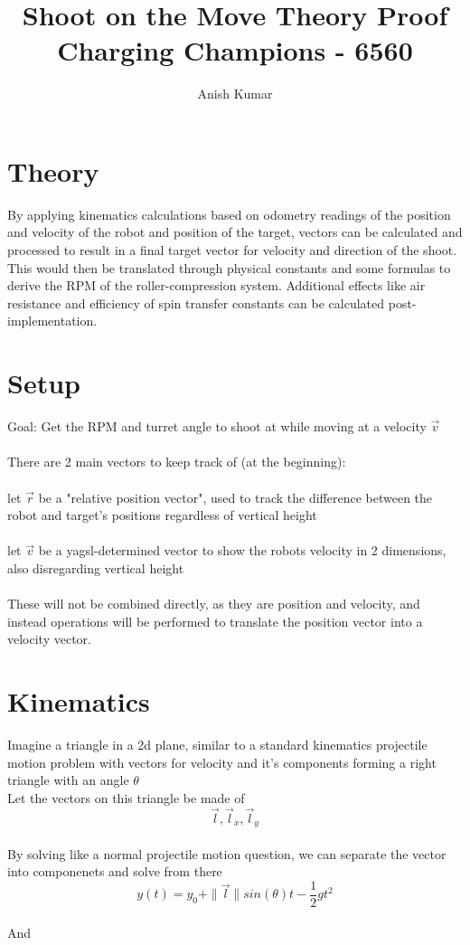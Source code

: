 \documentclass{article}
\title{Shoot on the Move Theory Proof\\
\large Charging Champions - 6560}
\author{Anish Kumar}
\begin{document}
\maketitle

\section{Theory}

By applying kinematics calculations based on odometry readings of the position and velocity of the robot and position of the target, vectors can be calculated and processed to result in a final target vector for velocity and direction of the shoot. This would then be translated through physical constants and some formulas to derive the RPM of the roller-compression system. Additional effects like air resistance and efficiency of spin transfer constants can be calculated post-implementation.

\section{Setup}

Goal: Get the RPM and turret angle to shoot at while moving at a velocity $\vec{v}$
\\
\\
There are 2 main vectors to keep track of (at the beginning):
\\
\\
let $\vec{r}$ be a "relative position vector", used to track the difference between the robot and target's positions regardless of vertical height 
\\
\\
let $\vec{v}$ be a yagsl-determined vector to show the robots velocity in 2 dimensions, also disregarding vertical height
\\
\\
These will not be combined directly, as they are position and velocity, and instead operations will be performed to translate the position vector into a velocity vector.
\\

\section{Kinematics}

Imagine a triangle in a 2d plane, similar to a standard kinematics projectile motion problem with vectors for velocity and it's components forming a right triangle with an angle $\theta$
\\
Let the vectors on this triangle be made of 
\[
\vec{l} , \vec{l}_x , \vec{l}_y
\]
\\
By solving like a normal projectile motion question, we can separate the vector into componenets and solve from there
\[y(t) = y_0 + \|\vec{l}\|sin(\theta) t - \frac{1}{2}gt^{2}\]
\\
And
\end{document}
